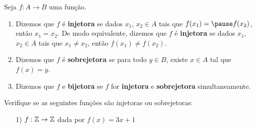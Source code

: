 \documentclass{beamer}
\begin{document}
    \begin{frame}
        \begin{definicao}
            Seja $f : A \to B$ uma fun\c{c}\~ao.\pause
            \begin{enumerate}[label={\roman*})]
                \item Dizemos que $f$ \'e \textbf{injetora} \pause se dados $x_1$, \pause $x_2 \in A$ \pause tais que $f(x_1) = \pause f(x_2)$, \pause ent\~ao $x_1 = x_2$. \pause De modo equivalente, \pause dizemos que $f$ \'e \textbf{injetora} \pause se dados $x_1$, \pause $x_2 \in A$ \pause tais que $x_1 \ne x_2$, \pause ent\~ao $f(x_1) \ne f(x_2)$.\pause

                \vspace{.3cm}

                \item Dizemos que $f$ \'e \textbf{sobrejetora} \pause se para todo $y \in B$, \pause existe $x \in A$ \pause tal que $f(x) = y$.\pause

                \vspace{.3cm}

                \item Dizemos que $f$ e \textbf{bijetora} \pause se $f$ for \textbf{injetora} \pause e \textbf{sobrejetora} \pause simultaneamente.\pause

                \vspace{.3cm}
            \end{enumerate}
        \end{definicao}
    \end{frame}

    \begin{frame}
        \begin{exemplos}
            Verifique se as seguintes fun\c{c}\~oes s\~ao injetoras \pause ou sobrejetoras:\pause
            \begin{enumerate}
                \item[1)] $f : \mathbb{Z} \to \mathbb{Z}$ dada por $f(x) = 3x + 1$
            \end{enumerate}
        \end{exemplos}

        \vspace{5cm}
    \end{frame}

    \begin{frame}
        \vspace{5cm}
    \end{frame}
\end{document}
